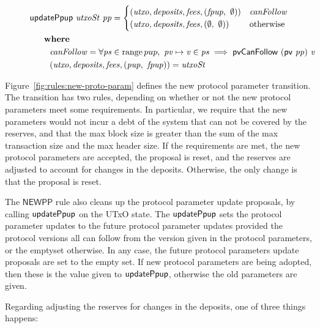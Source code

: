 \begin{figure}[htb]
\begin{align*}
      & \mathsf{updatePpup}~\mathit{utxoSt}~\mathit{pp} =
      \begin{cases}
        (\mathit{utxo},\mathit{deposits},\mathit{fees},(\mathit{fpup},~\emptyset))
        &
        \mathit{canFollow}
        \\
        (\mathit{utxo},\mathit{deposits},\mathit{fees},(\emptyset,~\emptyset))
        &
        \text{otherwise} \\
      \end{cases}\\
      & ~~~~ ~ \mathbf{where}~ ~  \\
      & ~~~~~~~\mathit{canFollow} =
        \forall\mathit{ps}\in\operatorname{range}{pup},~
        \mathit{pv}\mapsto\mathit{v}\in\mathit{ps}\implies\mathsf{pvCanFollow}~(\mathsf{pv}~\mathit{pp})~\mathit{v}
        \\
      & ~~~~~~~(\mathit{utxo},\mathit{deposits},\mathit{fees},(\mathit{pup},~\mathit{fpup})) = \mathit{utxoSt} \\
  \end{align*}
\end{figure}


Figure~\ref{fig:rules:new-proto-param} defines the new protocol parameter transition.
The transition has two rules, depending on whether or not the new protocol parameters
meet some requirements.
In particular, we require that the new parameters would not incur a debt of the system that
can not be covered by the reserves, and that the max block size is greater than the sum of the
max transaction size and the max header size.
If the requirements are met, the new protocol parameters are accepted, the proposal is reset,
and the reserves are adjusted to account for changes in the deposits.
Otherwise, the only change is that the proposal is reset.

The $\mathsf{NEWPP}$ rule also cleans up the protocol parameter update proposals,
by calling $\mathsf{updatePpup}$ on the UTxO state.
The $\mathsf{updatePpup}$ sets the protocol parameter updates to the future protocol
parameter updates provided the protocol versions all can follow from the
version given in the protocol parameters, or the emptyset otherwise.
In any case, the future protocol parameters update proposals are set to the empty set.
If new protocol parameters are being adopted, then these is the value given to
$\mathsf{updatePpup}$, otherwise the old parameters are given.

Regarding adjusting the reserves for changes in the deposits, one of three things happens:

